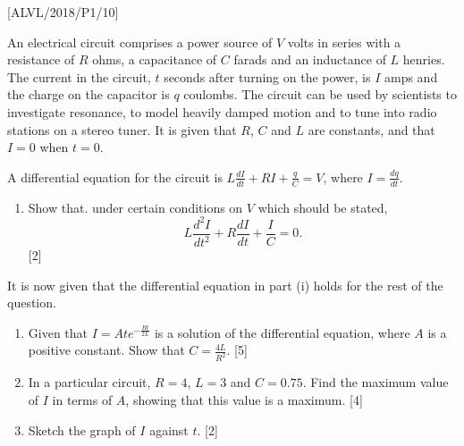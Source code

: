 \item {[}ALVL/2018/P1/10{]}

An electrical circuit comprises a power source of $V$ volts in series
with a resistance of $R$ ohms, a capacitance of $C$ farads and an
inductance of $L$ henries. The current in the circuit, $t$ seconds
after turning on the power, is $I$ amps and the charge on the capacitor
is $q$ coulombs. The circuit can be used by scientists to investigate
resonance, to model heavily damped motion and to tune into radio stations
on a stereo tuner. It is given that $R$, $C$ and $L$ are constants,
and that $I=0$ when $t=0$.

A differential equation for the circuit is $L\frac{dI}{dt}+RI+\frac{q}{C}=V$,
where $I=\frac{dq}{dt}$. 
\begin{enumerate}
\item Show that. under certain conditions on $V$ which should be stated,
\[
L\frac{d^{2}I}{dt^{2}}+R\frac{dI}{dt}+\frac{I}{C}=0.
\]
\hfill{}{[}2{]}
\end{enumerate}
It is now given that the differential equation in part (i) holds for
the rest of the question.
\begin{enumerate}
\item Given that $I=Ate^{-\frac{Rt}{2L}}$ is a solution of the differential
equation, where $A$ is a positive constant. Show that $C=\frac{4L}{R^{2}}$.\hfill{}
{[}5{]}
\item In a particular circuit, $R=4$, $L=3$ and $C=0.75$. Find the maximum
value of $I$ in terms of $A$, showing that this value is a maximum.\hfill{}
{[}4{]}
\item Sketch the graph of $I$ against $t$. \hfill{}{[}2{]}
\end{enumerate}
